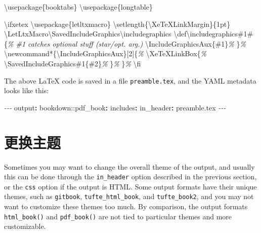 \documentclass[
  12pt,
]{krantz}
\newenvironment{Shaded}{\begin{snugshade}}{\end{snugshade}}
\newcommand{\AttributeTok}[1]{\textcolor[rgb]{0.77,0.63,0.00}{#1}}
\newcommand{\BuiltInTok}[1]{#1}
\newcommand{\CommentTok}[1]{\textcolor[rgb]{0.56,0.35,0.01}{\textit{#1}}}
\newcommand{\ExtensionTok}[1]{#1}
\newcommand{\FunctionTok}[1]{\textcolor[rgb]{0.00,0.00,0.00}{#1}}
\newcommand{\KeywordTok}[1]{\textcolor[rgb]{0.13,0.29,0.53}{\textbf{#1}}}
\newcommand{\NormalTok}[1]{#1}
\newcommand{\PreprocessorTok}[1]{\textcolor[rgb]{0.56,0.35,0.01}{\textit{#1}}}
\theoremstyle{definition}
\theoremstyle{definition}
\theoremstyle{definition}
\theoremstyle{definition}
\theoremstyle{remark}
\begin{document}
\begin{Shaded}
\begin{Highlighting}[]
\BuiltInTok{\textbackslash{}usepackage}\NormalTok{\{}\ExtensionTok{booktabs}\NormalTok{\}}
\BuiltInTok{\textbackslash{}usepackage}\NormalTok{\{}\ExtensionTok{longtable}\NormalTok{\}}

\FunctionTok{\textbackslash{}ifxetex}
  \BuiltInTok{\textbackslash{}usepackage}\NormalTok{\{}\ExtensionTok{letltxmacro}\NormalTok{\}}
  \FunctionTok{\textbackslash{}setlength}\NormalTok{\{}\FunctionTok{\textbackslash{}XeTeXLinkMargin}\NormalTok{\}\{1pt\}}
  \FunctionTok{\textbackslash{}LetLtxMacro\textbackslash{}SavedIncludeGraphics\textbackslash{}includegraphics}
  \FunctionTok{\textbackslash{}def\textbackslash{}includegraphics}\NormalTok{\#1\#\{}\CommentTok{\% \#1 catches optional stuff (star/opt. arg.)}
    \FunctionTok{\textbackslash{}IncludeGraphicsAux}\NormalTok{\{\#1\}}\CommentTok{\%}
\NormalTok{  \}}\CommentTok{\%}
  \FunctionTok{\textbackslash{}newcommand*}\NormalTok{\{}\ExtensionTok{\textbackslash{}IncludeGraphicsAux}\NormalTok{\}[2]\{}\CommentTok{\%}
    \FunctionTok{\textbackslash{}XeTeXLinkBox}\NormalTok{\{}\CommentTok{\%}
      \FunctionTok{\textbackslash{}SavedIncludeGraphics}\NormalTok{\#1\{\#2\}}\CommentTok{\%}
\NormalTok{    \}}\CommentTok{\%}
\NormalTok{  \}}\CommentTok{\%}
\FunctionTok{\textbackslash{}fi}
\end{Highlighting}
\end{Shaded}

The above LaTeX code is saved in a file \texttt{preamble.tex}, and the YAML metadata looks like this:

\begin{Shaded}
\begin{Highlighting}[]
\PreprocessorTok{{-}{-}{-}}
\FunctionTok{output}\KeywordTok{:}
\AttributeTok{  bookdown:}\FunctionTok{:pdf\_book}\KeywordTok{:}
\AttributeTok{    }\FunctionTok{includes}\KeywordTok{:}
\AttributeTok{      }\FunctionTok{in\_header}\KeywordTok{:}\AttributeTok{ preamble.tex}
\PreprocessorTok{{-}{-}{-}}
\end{Highlighting}
\end{Shaded}

\hypertarget{ux66f4ux6362ux4e3bux9898}{%
\section{更换主题}\label{ux66f4ux6362ux4e3bux9898}}

Sometimes you may want to change the overall theme of the output, and usually this can be done through the \texttt{in\_header} option described in the previous section, or the \texttt{css} option if the output is HTML. Some output formats have their unique themes, such as \texttt{gitbook}, \texttt{tufte\_html\_book}, and \texttt{tufte\_book2}, and you may not want to customize these themes too much. By comparison, the output formats \texttt{html\_book()} and \texttt{pdf\_book()} are not tied to particular themes and more customizable.
\end{document}
